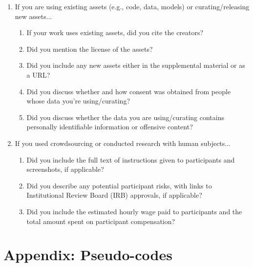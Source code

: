\documentclass{article}
\begin{document}
\begin{enumerate}
\item If you are using existing assets (e.g., code, data, models) or curating/releasing new assets...
\begin{enumerate}
  \item If your work uses existing assets, did you cite the creators?
    \answerYes{}
  \item Did you mention the license of the assets?
    \answerYes{}
  \item Did you include any new assets either in the supplemental material or as a URL?
  \item Did you discuss whether and how consent was obtained from people whose data you're using/curating?
    \answerNA{}
  \item Did you discuss whether the data you are using/curating contains personally identifiable information or offensive content?
    \answerNA{}
\end{enumerate}


\item If you used crowdsourcing or conducted research with human subjects...
\begin{enumerate}
  \item Did you include the full text of instructions given to participants and screenshots, if applicable?
    \answerNA{}
  \item Did you describe any potential participant risks, with links to Institutional Review Board (IRB) approvals, if applicable?
    \answerNA{}
  \item Did you include the estimated hourly wage paid to participants and the total amount spent on participant compensation?
    \answerNA{}
\end{enumerate}


\end{enumerate}





\newpage

\appendix


\section{Appendix: Pseudo-codes} \label{appendix:pseuocodes}
\end{document}
